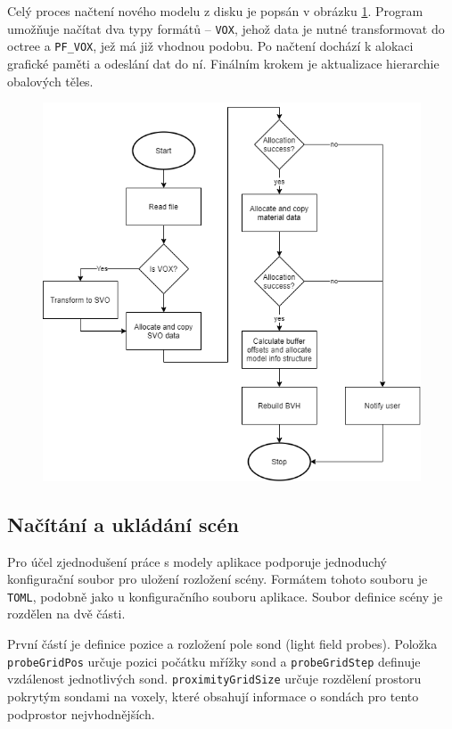 Celý proces načtení nového modelu z disku je popsán v obrázku \ref{fig:load_model_diagram}. Program umožňuje načítat dva typy formátů -- \texttt{VOX}, jehož data je nutné transformovat do octree a \texttt{PF\_VOX}, jež má již vhodnou podobu. Po načtení dochází k alokaci grafické paměti a odeslání dat do ní. Finálním krokem je aktualizace hierarchie obalových těles.

\begin{figure}[H]
	\centering
	\includegraphics[scale=0.7]{images/load_diagram.png}
	\captionsetup{justification=centering}
	\label{fig:load_model_diagram}
\end{figure}

\subsection{Načítání a ukládání scén}
Pro účel zjednodušení práce s modely aplikace podporuje jednoduchý konfigurační soubor pro uložení rozložení scény. Formátem tohoto souboru je \texttt{TOML}, podobně jako u konfiguračního souboru aplikace. Soubor definice scény je rozdělen na dvě části.

První částí je definice pozice a rozložení pole sond (light field probes). Položka \texttt{probeGridPos} určuje pozici počátku mřížky sond a \texttt{probeGridStep} definuje vzdálenost jednotlivých sond. \texttt{proximityGridSize} určuje rozdělení prostoru pokrytým sondami na voxely, které obsahují informace o sondách pro tento podprostor nejvhodnějších.

